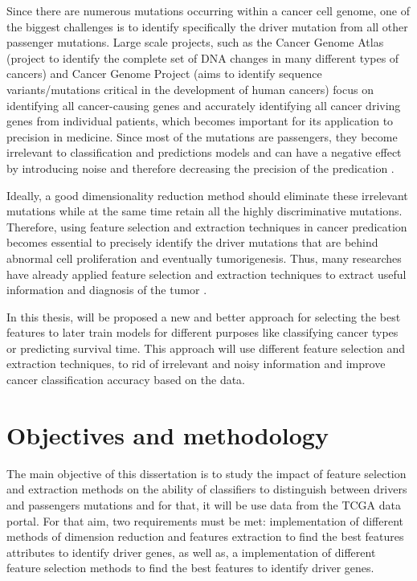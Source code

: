 Since there are numerous mutations occurring within a cancer cell genome, one of the biggest challenges is to identify specifically the driver mutation from all other passenger mutations. Large scale projects, such as the Cancer Genome Atlas (project to identify the complete set of DNA changes in many different types of cancers) and Cancer Genome Project (aims to identify sequence variants/mutations critical in the development of human cancers) focus on identifying all cancer-causing genes and accurately identifying all cancer driving genes from individual patients, which becomes important for its application to precision in medicine. Since most of the mutations are passengers, they become irrelevant to classification and predictions models and can have a negative effect by introducing noise and therefore decreasing the precision of the predication \cite{Li}.   

Ideally, a good dimensionality reduction method should eliminate these irrelevant mutations while at the same time retain all the highly discriminative mutations. Therefore, using feature selection and extraction techniques in cancer predication becomes essential to precisely identify the driver mutations that are behind abnormal cell proliferation and eventually tumorigenesis. Thus, many researches have already applied feature selection and extraction techniques to extract useful information and diagnosis of the tumor \cite{Abeer}.

In this thesis, will be proposed a new and better approach for selecting the best features to later train models for different purposes like classifying cancer types or predicting survival time. This approach will use different feature selection and extraction techniques, to rid of irrelevant and noisy information and improve cancer classification accuracy based on the  data. 

\section{Objectives and methodology}
\label{objectives_and_methodology}
\hspace{10px}The main objective of this dissertation is to study the impact of feature selection and extraction methods on the ability of classifiers to distinguish between drivers and passengers mutations and for that, it will be use data from the TCGA data portal. For that aim, two requirements must be met: implementation of different methods of dimension reduction and features extraction to find the best features attributes to identify driver genes, as well as, a implementation of  different feature selection methods to find the best features to identify driver genes.

